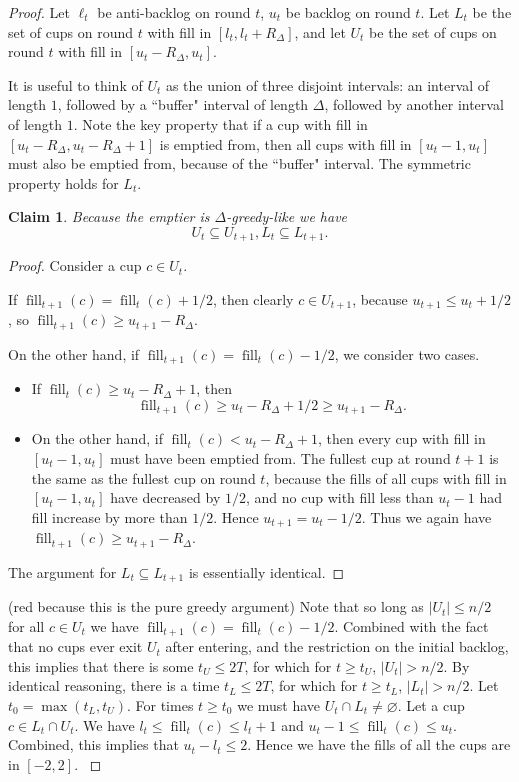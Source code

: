 \documentclass[twocolumn]{article}[10pt]
\DeclareMathOperator{\fil}{\text{fill}}
\newtheorem{clm}{Claim}
\begin{document}
\begin{proof}
  Let $\ell_t$ be anti-backlog on round $t$, $u_t$ be backlog on round $t$. Let
  $L_t$ be the set of cups on round $t$ with fill in $[l_t, l_t+R_\Delta]$, and let
  $U_t$ be the set of cups on round $t$ with fill in $[u_t-R_\Delta, u_t]$.

  It is useful to think of $U_t$ as the union of three disjoint intervals: an
  interval of length $1$, followed by a ``buffer" interval of length $\Delta$,
  followed by another interval of length $1$. Note the key property that if a
  cup with fill in $[u_t-R_\Delta, u_t-R_\Delta+1]$ is emptied from, then all
  cups with fill in $[u_t-1, u_t]$ must also be emptied from, because of the
  ``buffer" interval. The symmetric property holds for $L_t$.

  \begin{clm}
    Because the emptier is $\Delta$-greedy-like we have
    $$U_{t} \subseteq U_{t+1}, L_t \subseteq L_{t+1}.$$
  \end{clm}
  \begin{proof}
    Consider a cup $c\in U_t$.

    If $\fil_{t+1}(c) = \fil_t(c)+1/2$, then clearly $c \in U_{t+1}$, because
    $u_{t+1}\le u_t+1/2$, so $\fil_{t+1}(c)\ge u_{t+1} -R_\Delta$.

    On the other hand, if $\fil_{t+1}(c) = \fil_t(c) - 1/2$, we consider two cases.
    \begin{itemize}
      \item If $\fil_t(c) \ge u_t-R_\Delta +1$, then $$\fil_{t+1}(c) \ge
        u_t-R_\Delta+1/2\ge u_{t+1}-R_\Delta.$$
      \item On the other hand, if $\fil_t(c) < u_t-R_\Delta+1$, then every cup
        with fill in $[u_t-1, u_t]$ must have been emptied
        from. The fullest cup at round $t+1$ is the same as the fullest cup on
        round $t$, because the fills of all cups with fill in
        $[u_t-1, u_t]$ have decreased by $1/2$, and no cup with fill less than
        $u_t-1$ had fill increase by more than $1/2$. Hence $u_{t+1} = u_t -1/2$.
        Thus we again have $\fil_{t+1}(c) \ge u_{t+1}-R_\Delta$.
    \end{itemize}

    The argument for $L_t \subseteq L_{t+1}$ is essentially identical.
  \end{proof}

  {\color{red} (red because this is the pure greedy argument)
  Note that so long as $|U_t| \le n/2$ for all $c\in U_t$ we have
  $\fil_{t+1}(c) = \fil_t(c) - 1/2$. Combined with the fact that no cups ever
  exit $U_t$ after entering, and the restriction on the initial backlog, this
  implies that there is some $t_U \le 2T$, for which for $t\ge t_U$, $|U_t| >
  n/2$. By identical reasoning, there is a time $t_L \le 2T$, for which for $t
  \ge t_L$, $|L_t| > n/2$. Let $t_0 = \max(t_L, t_U)$. For times $t \ge t_0$ we
  must have $U_t \cap L_t \neq \varnothing$. Let a cup $c \in L_t \cap U_t$. We
  have $l_t \le \fil_t(c) \le l_t+1$ and $u_t-1 \le \fil_t(c) \le u_t$.
  Combined, this implies that $u_t - l_t \le 2$. Hence we have the fills of all
  the cups are in $[-2, 2]$.
}

\end{proof}
\end{document}
